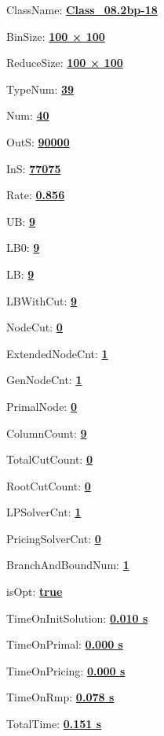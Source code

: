\documentclass[11pt]{article}
\begin{document}
\pagestyle{empty}


ClassName: \underline{\textbf{Class_08.2bp-18}}
\par
BinSize: \underline{\textbf{100 × 100}}
\par
ReduceSize: \underline{\textbf{100 × 100}}
\par
TypeNum: \underline{\textbf{39}}
\par
Num: \underline{\textbf{40}}
\par
OutS: \underline{\textbf{90000}}
\par
InS: \underline{\textbf{77075}}
\par
Rate: \underline{\textbf{0.856}}
\par
UB: \underline{\textbf{9}}
\par
LB0: \underline{\textbf{9}}
\par
LB: \underline{\textbf{9}}
\par
LBWithCut: \underline{\textbf{9}}
\par
NodeCut: \underline{\textbf{0}}
\par
ExtendedNodeCnt: \underline{\textbf{1}}
\par
GenNodeCnt: \underline{\textbf{1}}
\par
PrimalNode: \underline{\textbf{0}}
\par
ColumnCount: \underline{\textbf{9}}
\par
TotalCutCount: \underline{\textbf{0}}
\par
RootCutCount: \underline{\textbf{0}}
\par
LPSolverCnt: \underline{\textbf{1}}
\par
PricingSolverCnt: \underline{\textbf{0}}
\par
BranchAndBoundNum: \underline{\textbf{1}}
\par
isOpt: \underline{\textbf{true}}
\par
TimeOnInitSolution: \underline{\textbf{0.010 s}}
\par
TimeOnPrimal: \underline{\textbf{0.000 s}}
\par
TimeOnPricing: \underline{\textbf{0.000 s}}
\par
TimeOnRmp: \underline{\textbf{0.078 s}}
\par
TotalTime: \underline{\textbf{0.151 s}}
\par
\newpage


\end{document}
